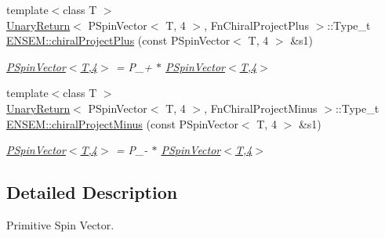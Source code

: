 \begin{DoxyCompactItemize}
\item 
{\footnotesize template$<$class T $>$ }\\\mbox{\hyperlink{structUnaryReturn}{Unary\+Return}}$<$ P\+Spin\+Vector$<$ T, 4 $>$, Fn\+Chiral\+Project\+Plus $>$\+::Type\+\_\+t \mbox{\hyperlink{group__primspinvector_ga2d58ba66261a878c90b4c5dbc1af1863}{E\+N\+S\+E\+M\+::chiral\+Project\+Plus}} (const P\+Spin\+Vector$<$ T, 4 $>$ \&s1)
\begin{DoxyCompactList}\small\item\em \mbox{\hyperlink{classENSEM_1_1PSpinVector_3_01T_00_014_01_4}{P\+Spin\+Vector$<$\+T,4$>$}} = P\+\_\++ $\ast$ \mbox{\hyperlink{classENSEM_1_1PSpinVector_3_01T_00_014_01_4}{P\+Spin\+Vector$<$\+T,4$>$}} \end{DoxyCompactList}\item 
{\footnotesize template$<$class T $>$ }\\\mbox{\hyperlink{structUnaryReturn}{Unary\+Return}}$<$ P\+Spin\+Vector$<$ T, 4 $>$, Fn\+Chiral\+Project\+Minus $>$\+::Type\+\_\+t \mbox{\hyperlink{group__primspinvector_ga7af53ea534552edc873a7cb1f52a94e1}{E\+N\+S\+E\+M\+::chiral\+Project\+Minus}} (const P\+Spin\+Vector$<$ T, 4 $>$ \&s1)
\begin{DoxyCompactList}\small\item\em \mbox{\hyperlink{classENSEM_1_1PSpinVector_3_01T_00_014_01_4}{P\+Spin\+Vector$<$\+T,4$>$}} = P\+\_\+-\/ $\ast$ \mbox{\hyperlink{classENSEM_1_1PSpinVector_3_01T_00_014_01_4}{P\+Spin\+Vector$<$\+T,4$>$}} \end{DoxyCompactList}\end{DoxyCompactItemize}


\subsection{Detailed Description}
Primitive Spin Vector. 

